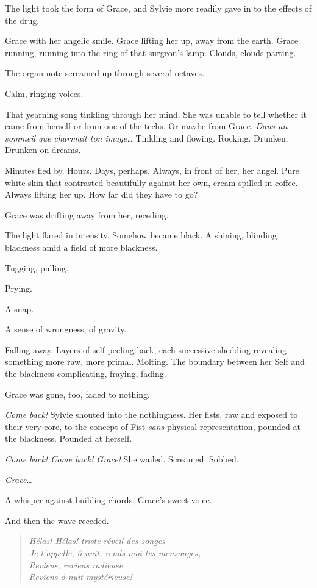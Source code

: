 The light took the form of Grace, and Sylvie more readily gave in to the effects of the drug.

Grace with her angelic smile. Grace lifting her up, away from the earth. Grace running, running into the ring of that surgeon's lamp. Clouds, clouds parting.

The organ note screamed up through several octaves.

Calm, ringing voices.

That yearning song tinkling through her mind. She was unable to tell whether it came from herself or from one of the techs. Or maybe from Grace. \emph{Dans un sommeil que charmait ton image\ldots{}} Tinkling and flowing. Rocking. Drunken. Drunken on dreams.

Minutes fled by. Hours. Days, perhaps. Always, in front of her, her angel. Pure white skin that contrasted beautifully against her own, cream spilled in coffee. Always lifting her up. How far did they have to go?

Grace was drifting away from her, receding.

The light flared in intensity. Somehow became black. A shining, blinding blackness amid a field of more blackness.

Tugging, pulling.

Prying.

A snap.

A sense of wrongness, of gravity.

Falling away. Layers of self peeling back, each successive shedding revealing something more raw, more primal. Molting. The boundary between her Self and the blackness complicating, fraying, fading.

Grace was gone, too, faded to nothing.

\emph{Come back!} Sylvie shouted into the nothingness. Her fists, raw and exposed to their very core, to the concept of Fist \emph{sans} physical representation, pounded at the blackness. Pounded at herself.

\emph{Come back! Come back! Grace!} She wailed. Screamed. Sobbed.

\emph{Grace\ldots{}}

A whisper against building chords, Grace's sweet voice.

And then the wave receded.

\begin{quote}
\emph{Hélas! Hélas! triste réveil des songes\\
Je t'appelle, ô nuit, rends moi tes mensonges,\\
Reviens, reviens radieuse,\\
Reviens ô nuit mystérieuse!}
\end{quote}

